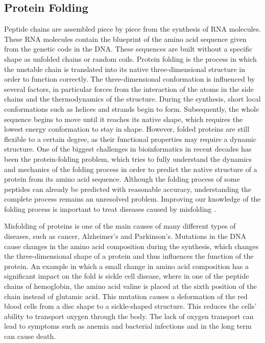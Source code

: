 \subsection{Protein Folding}

Peptide chains are assembled piece by piece from the synthesis of \ac{RNA} molecules. These \ac{RNA} molecules contain the blueprint of the amino acid sequence given from the genetic code in the \ac{DNA}. 
These sequences are built without a specific shape as unfolded chains or random coils. Protein folding is the process in which the unstable chain is translated into its native three-dimensional structure in order to function correctly.  
The three-dimensional conformation is influenced by several factors, in particular forces from the interaction of the atoms in the side chains and the thermodynamics of the structure. 
During the synthesis, short local conformations such as helices and strands begin to form. Subsequently, the whole sequence begins to move until it reaches its native shape, which requires the lowest energy conformation to stay in shape.  
However, folded proteins are still flexible to a certain degree, as their functional properties may require a dynamic structure. 
One of the biggest challenges in bioinformatics in recent decades has been the protein-folding problem, which tries to fully understand the dynamics and mechanics of the folding process in order to predict the native structure of a protein from its amino acid sequence. 
 Although the folding process of some peptides can already be predicted with reasonable accuracy, understanding the complete process remains an unresolved problem. Improving our knowledge of the folding process is important to treat diseases caused by misfolding  \cite{Dill.2012}.

Misfolding of proteins is one of the main causes of many different types of diseases, such as cancer, Alzheimer’s and Parkinson’s. Mutations in the DNA cause changes in the amino acid composition during the synthesis, which changes the three-dimensional shape of a protein and thus influences the function of the protein. An example in which a small change in amino acid composition has a significant impact on the fold is sickle cell disease, where in one of the peptide chains of hemoglobin, the amino acid valine is placed at the sixth position of the chain instead of glutamic acid. This mutation causes a deformation of the red blood cells from a disc shape to a sickle-shaped structure. This reduces the cells’ ability to transport oxygen through the body. The lack of oxygen transport can lead to symptoms such as anemia and bacterial infections and in the long term can cause death.
 


